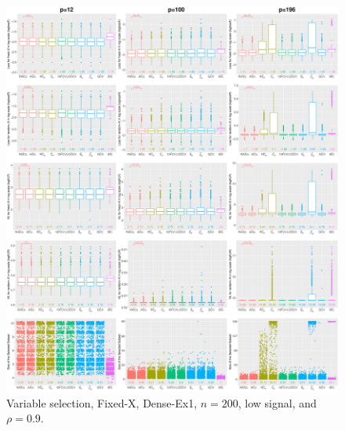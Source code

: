 \begin{figure}[!ht]
\centering
\includegraphics[width=\textwidth]{figures/supplement/fixedx/subset_selection/Dense-Ex1_n200_lsnr_rho09.eps}
\caption{Variable selection, Fixed-X, Dense-Ex1, $n=200$, low signal, and $\rho=0.9$.}
\end{figure}
\clearpage
